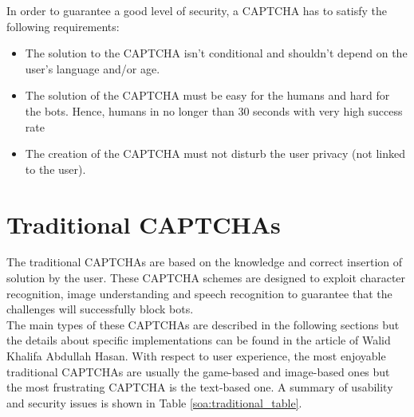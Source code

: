 In order to guarantee a good level of security, a CAPTCHA has to satisfy the following requirements:
\begin{itemize}
	\item{The solution to the CAPTCHA isn't conditional and shouldn't depend on the user's language and/or age.}
	\item{The solution of the CAPTCHA must be easy for the humans and hard for the bots. Hence, humans in no longer than 30 seconds with very high success rate}
	\item{The creation of the CAPTCHA must not disturb the user privacy (not linked to the user).}
\end{itemize}

\section{Traditional CAPTCHAs}
The traditional CAPTCHAs are based on the knowledge and correct insertion of solution by the user. These CAPTCHA schemes are designed to exploit character recognition, image understanding and speech recognition to guarantee that the challenges will successfully block bots.\\
The main types of these CAPTCHAs are described in the following sections but the details about specific implementations can be found in the article of Walid Khalifa Abdullah Hasan\cite{survey_advanced_CAPTCHA}. With respect to user experience, the most enjoyable traditional CAPTCHAs are usually the game-based and image-based ones but the most frustrating CAPTCHA is the text-based one\cite{usability_CAPTCHA}. A summary of usability and security issues is shown in Table \ref{soa:traditional_table}.

